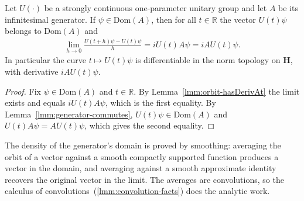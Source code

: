 \begin{lemma}
    \label{lmm:hall-10.17}
    \leanok
    Let $U(\cdot)$ be a strongly continuous one-parameter unitary group and let $A$ be its infinitesimal generator. If $\psi \in \text{Dom}(A)$, then for all $t \in \mathbb{R}$ the vector $U(t)\psi$ belongs to $\text{Dom}(A)$ and
    \begin{align}
        \lim\limits_{h \rightarrow 0} \frac{U(t+h)\psi - U(t)\psi}{h} = iU(t)A\psi = iAU(t)\psi.
    \end{align}
    In particular the curve $t \mapsto U(t)\psi$ is differentiable in the norm topology on $\mathbf{H}$, with derivative $iAU(t)\psi$.
\end{lemma}
\begin{proof}
    \leanok
Fix $\psi \in \text{Dom}(A)$ and $t \in \mathbb{R}$. By Lemma~\ref{lmm:orbit-hasDerivAt} the limit exists and equals $iU(t)A\psi$, which is the first equality. By Lemma~\ref{lmm:generator-commutes}, $U(t)\psi \in \text{Dom}(A)$ and $U(t)A\psi = AU(t)\psi$, which gives the second equality.
\end{proof}

The density of the generator's domain is proved by smoothing: averaging the orbit of a vector against a smooth compactly supported function produces a vector in the domain, and averaging against a smooth approximate identity recovers the original vector in the limit. The averages are convolutions, so the calculus of convolutions~(\ref{lmm:convolution-facts}) does the analytic work.

